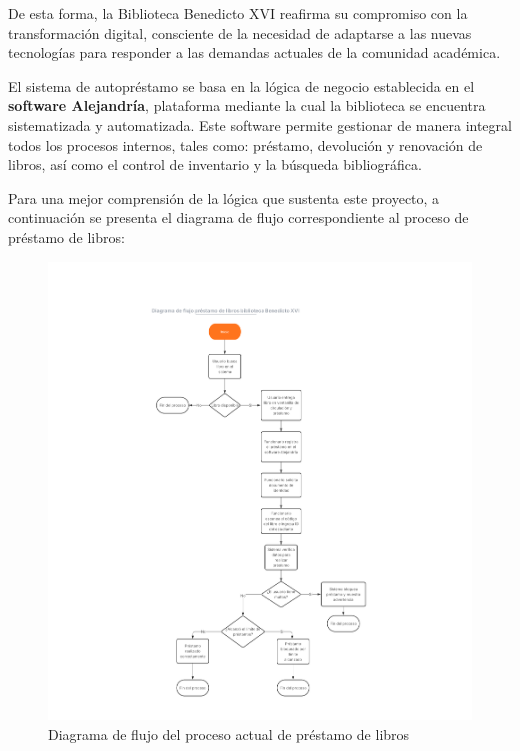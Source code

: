 \documentclass[spanish]{ieee_upb}
\begin{document}
De esta forma, la Biblioteca Benedicto XVI reafirma su compromiso con la transformación digital, consciente de la necesidad de adaptarse a las nuevas tecnologías para responder a las demandas actuales de la comunidad académica.\vspace{0.3 cm}

El sistema de autopréstamo se basa en la lógica de negocio establecida en el \textbf{software Alejandría}, plataforma mediante la cual la biblioteca se encuentra sistematizada y automatizada. Este software permite gestionar de manera integral todos los procesos internos, tales como: préstamo, devolución y renovación de libros, así como el control de inventario y la búsqueda bibliográfica.\vspace{0.3 cm}

Para una mejor comprensión de la lógica que sustenta este proyecto, a continuación se presenta el diagrama de flujo correspondiente al proceso de préstamo de libros:\vspace{0.3 cm}

\begin{figure}[H]
    \centering
    \includegraphics[width=0.9\linewidth]{img/DFpasosPrestamo.png}
    \caption[Préstamo de libros biblioteca Benedicto XVI]{Diagrama de flujo del proceso actual de préstamo de libros}
    \label{fig:diaFlujoPrestamo}
\end{figure}
\end{document}
